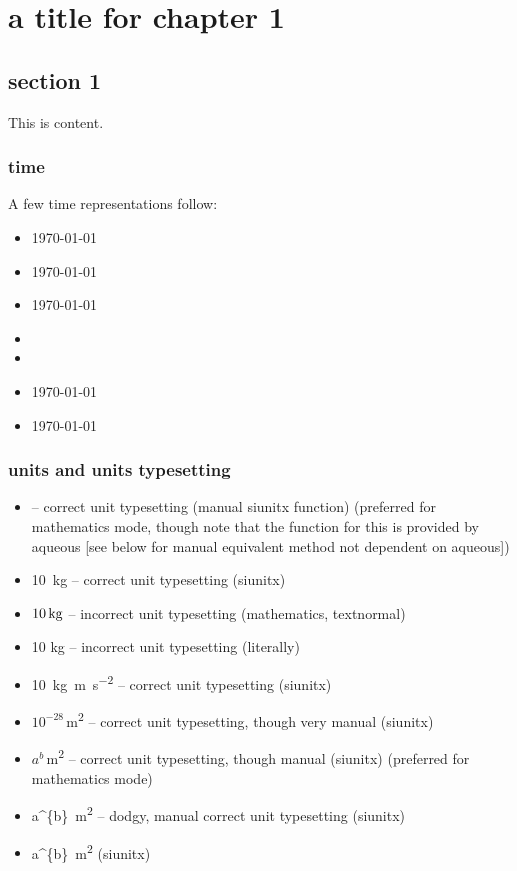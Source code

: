 \chapter{a title for chapter 1}
\label{chapter:chapter_1}
 
\section{section 1}
\label{section:section_1}

This is content.

\subsection{time}

A few time representations follow:

\begin{itemize}
\item \timeA\today
\item \timeB\today
\item \timeC\today
\item \timeD
\item \timeE
\item \timeF\today
\item \timeG\today
\end{itemize}

\subsection{units and units typesetting}

\begin{itemize}
\item {} -- correct unit typesetting (manual siunitx function) (preferred for mathematics mode, though note that the function for this is provided by aqueous [see below for manual equivalent method not dependent on aqueous])
\item \SI{10}{kg} -- correct unit typesetting (siunitx)
\item ${10\,\textnormal{kg}}$ -- incorrect unit typesetting (mathematics, textnormal)
\item 10 kg -- incorrect unit typesetting (literally)
\item \SI{10}{kg m s^{-2}} -- correct unit typesetting (siunitx)
\item ${10^{-28}}$\,\si{m^{2}} -- correct unit typesetting, though very manual (siunitx)
\item ${a^{b}}$\,\si{m^{2}} -- correct unit typesetting, though manual (siunitx) (preferred for mathematics mode)
\item \SI[parse-numbers=false]{a^{b}}{m^{2}} -- dodgy, manual correct unit typesetting (siunitx)
\item \SI[parse-numbers=false, number-math-rm=\ensuremath]{a^{b}}{m^{2}} (siunitx)
\end{itemize}


